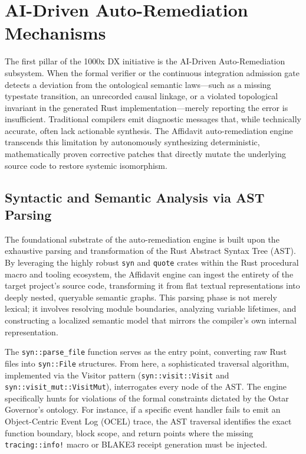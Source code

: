 \section{AI-Driven Auto-Remediation Mechanisms}
\label{sec:qol_auto_remediation}

The first pillar of the 1000x DX initiative is the AI-Driven Auto-Remediation subsystem. When the formal verifier or the continuous integration admission gate detects a deviation from the ontological semantic laws---such as a missing typestate transition, an unrecorded causal linkage, or a violated topological invariant in the generated Rust implementation---merely reporting the error is insufficient. Traditional compilers emit diagnostic messages that, while technically accurate, often lack actionable synthesis. The Affidavit auto-remediation engine transcends this limitation by autonomously synthesizing deterministic, mathematically proven corrective patches that directly mutate the underlying source code to restore systemic isomorphism.

\subsection{Syntactic and Semantic Analysis via AST Parsing}

The foundational substrate of the auto-remediation engine is built upon the exhaustive parsing and transformation of the Rust Abstract Syntax Tree (AST). By leveraging the highly robust \texttt{syn} and \texttt{quote} crates within the Rust procedural macro and tooling ecosystem, the Affidavit engine can ingest the entirety of the target project's source code, transforming it from flat textual representations into deeply nested, queryable semantic graphs. This parsing phase is not merely lexical; it involves resolving module boundaries, analyzing variable lifetimes, and constructing a localized semantic model that mirrors the compiler's own internal representation. 

The \texttt{syn::parse\_file} function serves as the entry point, converting raw Rust files into \texttt{syn::File} structures. From here, a sophisticated traversal algorithm, implemented via the Visitor pattern (\texttt{syn::visit::Visit} and \texttt{syn::visit\_mut::VisitMut}), interrogates every node of the AST. The engine specifically hunts for violations of the formal constraints dictated by the Ostar Governor's ontology. For instance, if a specific event handler fails to emit an Object-Centric Event Log (OCEL) trace, the AST traversal identifies the exact function boundary, block scope, and return points where the missing \texttt{tracing::info!} macro or BLAKE3 receipt generation must be injected.

